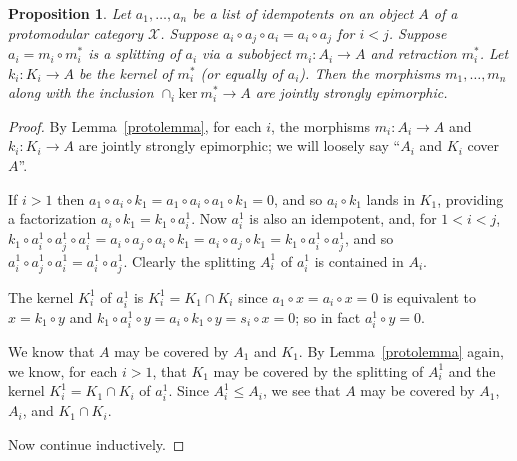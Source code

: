 \documentclass[a4paper,12pt,reqno]{amsart}
\newtheorem{proposition}[theorem]{Proposition}
\theoremstyle{definition}
\theoremstyle{fact}
\theoremstyle{genquest}
\theoremstyle{step}
\newcommand{\ra}{\rightarrow}
\def\CX{{\mathscr X}}
\begin{document}
\begin{proposition}\label{protoidemp}
Let $a_1,\dots,a_n$ be a list of idempotents on an object $A$ of a protomodular category $\CX$. 
Suppose $a_i\circ a_j\circ a_i=a_i\circ a_j$ for $i<j$.
Suppose $a_i=m_i\circ m_i^*$ is a splitting of $a_i$ via a subobject $m_i:A_i\ra A$
and retraction $m_i^*$.
Let $k_i:K_i\ra A$ be the kernel of $m_i^*$ (or equally of $a_i$).
Then the morphisms $m_1,\dots , m_n$ along with the inclusion $\cap_i{\mathrm{ ker} \ m_i^*} \ra A$ are jointly strongly epimorphic.
\end{proposition}
\begin{proof}
By Lemma~\ref{protolemma}, for each $i$, the morphisms $m_i:A_i\ra A$
and $k_i:K_i\ra A$ are jointly strongly epimorphic; we will loosely say ``$A_i$ and $K_i$
cover $A$''. 

If $i>1$ then $a_1\circ a_i\circ k_1=a_1\circ a_i\circ a_1\circ k_1=0$, and so $a_i\circ k_1$
lands in $K_1$, providing a factorization $a_i\circ k_1=k_1\circ a_i^1$.
Now $a_i^1$ is also an idempotent, and, for $1<i<j$, $k_1\circ a_i^1\circ a_j^1\circ a_i^1= a_i\circ a_j\circ a_i\circ k_1 = a_i\circ a_j\circ k_1= k_1\circ a_i^1\circ a_j^1$, and so
$a^1_i\circ a^1_j\circ a^1_i= a^1_i\circ a^1_j$. Clearly the splitting $A^1_i$ of $a^1_i$
is contained in $A_i$.

The kernel $K^1_i$ of $a^1_i$ is $K^1_i=K_1\cap K_i$ since $a_1\circ x=a_i\circ x = 0$ is equivalent to
$x=k_1\circ y$ and $k_1\circ a^1_i\circ y = a_i\circ k_1\circ y = s_i\circ x = 0$; 
so in fact $a^1_i\circ y=0$. 

We know that $A$ may be covered by $A_1$ and $K_1$. By Lemma~\ref{protolemma} again, we know, for each $i>1$, that $K_1$ may be covered by the splitting of $A^1_i$
and the kernel $K^1_i=K_1\cap K_i$ of $a^1_i$. Since $A^1_i\le A_i$, we see that
$A$ may be covered by $A_1$, $A_i$, and $K_1\cap K_i$.

Now continue inductively.  
\end{proof}
\end{document}
